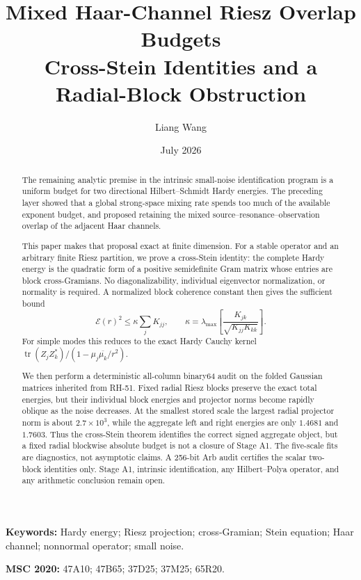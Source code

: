 \documentclass[11pt]{article}
\title{Mixed Haar-Channel Riesz Overlap Budgets\\
\large Cross-Stein Identities and a Radial-Block Obstruction}
\author{Liang Wang}
\date{July 2026}
\theoremstyle{remark}
\newcommand{\cE}{\mathcal E}
\newcommand{\tr}{\operatorname{tr}}
\begin{document}
\maketitle

\begin{abstract}
The remaining analytic premise in the intrinsic small-noise identification
program is a uniform budget for two directional Hilbert--Schmidt Hardy
energies.  The preceding layer showed that a global strong-space mixing rate
spends too much of the available exponent budget, and proposed retaining the
mixed source--resonance--observation overlap of the adjacent Haar channels.

This paper makes that proposal exact at finite dimension.  For a stable
operator and an arbitrary finite Riesz partition, we prove a cross-Stein
identity: the complete Hardy energy is the quadratic form of a positive
semidefinite Gram matrix whose entries are block cross-Gramians.  No
diagonalizability, individual eigenvector normalization, or normality is
required.  A normalized block coherence constant then gives the sufficient
bound
\[
 \cE(r)^2\le \kappa\sum_j K_{jj},
 \qquad
 \kappa=\lambda_{\max}\!\left[
 \frac{K_{jk}}{\sqrt{K_{jj}K_{kk}}}\right].
\]
For simple modes this reduces to the exact Hardy Cauchy kernel
\(\tr(Z_jZ_k^*)/(1-\mu_j\overline{\mu_k}/r^2)\).

We then perform a deterministic all-column binary64 audit on the folded
Gaussian matrices inherited from RH-51.  Fixed radial Riesz blocks preserve
the exact total energies, but their individual block energies and projector
norms become rapidly oblique as the noise decreases.  At the smallest stored
scale the largest radial projector norm is about \(2.7\times10^3\), while the
aggregate left and right energies are only \(1.4681\) and \(1.7603\).  Thus
the cross-Stein theorem identifies the correct signed aggregate object, but a
fixed radial blockwise absolute budget is not a closure of Stage A1.  The
five-scale fits are diagnostics, not asymptotic claims.  A 256-bit Arb audit
certifies the scalar two-block identities only.  Stage A1, intrinsic
identification, any Hilbert--Polya operator, and any arithmetic conclusion
remain open.
\end{abstract}

\noindent\textbf{Keywords:} Hardy energy; Riesz projection; cross-Gramian;
Stein equation; Haar channel; nonnormal operator; small noise.

\medskip
\noindent\textbf{MSC 2020:} 47A10; 47B65; 37D25; 37M25; 65R20.
\end{document}
